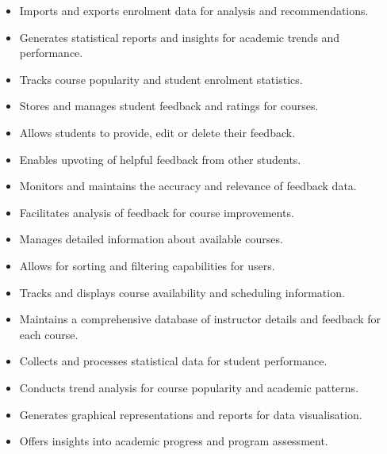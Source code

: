     \begin{itemize}[label=]
        \tightlist
        \item Imports and exports enrolment data for analysis and recommendations.
        \item Generates statistical reports and insights for academic trends and performance.
        \item Tracks course popularity and student enrolment statistics.
    \end{itemize}
    
    \begin{itemize}[label=]
        \tightlist
        \item Stores and manages student feedback and ratings for courses.
        \item Allows students to provide, edit or delete their feedback.
        \item Enables upvoting of helpful feedback from other students.
        \item Monitors and maintains the accuracy and relevance of feedback data.
        \item Facilitates analysis of feedback for course improvements.
    \end{itemize}

    \begin{itemize}[label=]
        \tightlist
        \item Manages detailed information about available courses.
        \item Allows for sorting and filtering capabilities for users.
        \item Tracks and displays course availability and scheduling information.
        \item Maintains a comprehensive database of instructor details and feedback for each course.
    \end{itemize}
    
    \begin{itemize}[label=]
        \tightlist
        \item Collects and processes statistical data for student performance.
        \item Conducts trend analysis for course popularity and academic patterns.
        \item Generates graphical representations and reports for data visualisation.
        \item Offers insights into academic progress and program assessment.
    \end{itemize}
    
